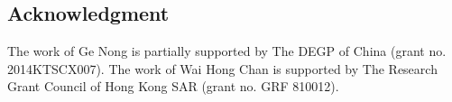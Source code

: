 \documentclass[10pt,journal,letterpaper,compsoc]{IEEEtran}
\begin{document}
\begin{CJK*}{GBK}{song}
\section*{Acknowledgment}
The work of Ge Nong is partially supported by The DEGP of China (grant no. 2014KTSCX007). The work of Wai Hong Chan is supported by The Research Grant Council of Hong Kong SAR (grant no. GRF 810012).




\end{CJK*}
\end{document}
